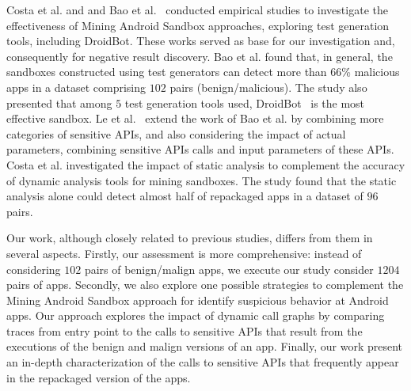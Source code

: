 


Costa et al. and and Bao et al.~\cite{DBLP:conf/wcre/BaoLL18,DBLP:conf/scam/CostaMCMVBC20} conducted empirical studies to investigate the effectiveness of Mining Android Sandbox
approaches, exploring test generation tools, including DroidBot. These works served as base for our investigation and, consequently for negative result discovery. Bao et al. found that, in general, the sandboxes constructed using test generators can detect more than $66$\% malicious apps in a dataset comprising $102$ pairs (benign/malicious). The study also presented that among $5$ test generation tools used, DroidBot~\cite{DBLP:conf/icse/LiYGC17} is the most effective sandbox.
Le et al.~\cite{le2018towards} extend the work of Bao et al. by combining more categories of sensitive APIs, and also considering the impact of actual parameters, combining sensitive APIs calls and input parameters of these APIs.
Costa et al.\cite{DBLP:journals/jss/CostaMMSSBNR22} investigated the impact of static analysis to complement the accuracy of dynamic analysis tools for mining sandboxes. The study found that the static analysis alone could detect almost half of repackaged apps in a dataset of $96$ pairs.


Our work, although closely related to previous studies, differs from them in several aspects.  Firstly, our assessment is more comprehensive: instead of considering $102$ pairs of benign/malign apps, we execute our study consider $1204$ pairs of apps. Secondly, we also explore one possible strategies to complement the Mining Android Sandbox approach for identify suspicious behavior at Android apps. Our approach explores the impact of dynamic call graphs by comparing traces from entry point to the calls to sensitive APIs that result from the executions of the benign and malign versions of an app. Finally, our work present an in-depth characterization of the calls to sensitive APIs that frequently appear in the repackaged version of the apps.
